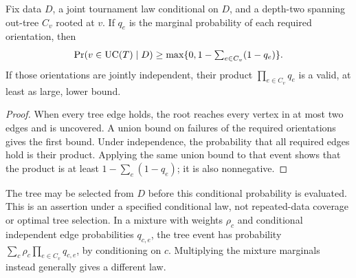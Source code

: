 \begin{proposition}\label{prop:posterior-tree-bound}
Fix data $D$, a joint tournament law conditional on $D$, and a depth-two spanning out-tree $C_v$ rooted at $v$. If $q_e$ is the marginal probability of each required orientation, then
\[
\Pr(v\in\mathrm{UC}(T)\mid D)\ge\max\{0,1-\textstyle\sum_{e\in C_v}(1-q_e)\}.
\]
If those orientations are jointly independent, their product $\prod_{e\in C_v}q_e$ is a valid, at least as large, lower bound.
\end{proposition}
\begin{proof}
When every tree edge holds, the root reaches every vertex in at most two edges and is uncovered. A union bound on failures of the required orientations gives the first bound. Under independence, the probability that all required edges hold is their product. Applying the same union bound to that event shows that the product is at least $1-\sum_e(1-q_e)$; it is also nonnegative.
\end{proof}
The tree may be selected from $D$ before this conditional probability is evaluated. This is an assertion under a specified conditional law, not repeated-data coverage or optimal tree selection. In a mixture with weights $\rho_c$ and conditional independent edge probabilities $q_{c,e}$, the tree event has probability $\sum_c\rho_c\prod_{e\in C_v}q_{c,e}$, by conditioning on $c$. Multiplying the mixture marginals instead generally gives a different law.

